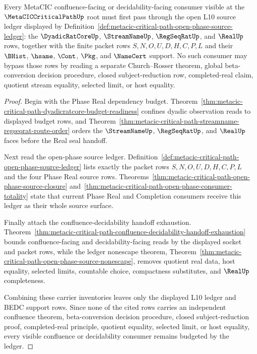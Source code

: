\begin{theorem}
\label{thm:metaciccriticalpath-confluence-decidability-budget}
Every MetaCIC confluence-facing or decidability-facing consumer visible at the $\MetaCICCriticalPathUp$ root must first pass through the open L10 source ledger displayed by Definition~\ref{def:metacic-critical-path-open-phase-source-ledger}: the $\DyadicRatCoreUp$, $\StreamNameUp$, $\RegSeqRatUp$, and $\RealUp$ rows, together with the finite packet rows $S,N,O,U,D,H,C,P,L$ and their $\BHist$, $\hsame$, $\Cont$, $\Pkg$, and $\NameCert$ support. No such consumer may bypass those rows by reading a separate Church--Rosser theorem, global beta-conversion decision procedure, closed subject-reduction row, completed-real claim, quotient stream equality, selected limit, or host equality.
\end{theorem}
\begin{proof}
Begin with the Phase Real dependency budget. Theorem~\ref{thm:metacic-critical-path-dyadicratcore-budget-readiness} confines dyadic observation reads to displayed budget rows, and Theorem~\ref{thm:metacic-critical-path-streamname-regseqrat-route-order} orders the $\StreamNameUp$, $\RegSeqRatUp$, and $\RealUp$ faces before the Real seal handoff.

Next read the open-phase source ledger. Definition~\ref{def:metacic-critical-path-open-phase-source-ledger} lists exactly the packet rows $S,N,O,U,D,H,C,P,L$ and the four Phase Real source rows. Theorems~\ref{thm:metacic-critical-path-open-phase-source-closure} and~\ref{thm:metacic-critical-path-open-phase-consumer-totality} state that current Phase Real and Completion consumers receive this ledger as their whole source surface.

Finally attach the confluence-decidability handoff exhaustion. Theorem~\ref{thm:metacic-critical-path-confluence-decidability-handoff-exhaustion} bounds confluence-facing and decidability-facing reads by the displayed socket and packet rows, while the ledger nonescape theorem, Theorem~\ref{thm:metacic-critical-path-open-phase-source-nonescape}, removes quotient real data, host equality, selected limits, countable choice, compactness substitutes, and $\RealUp$ completeness.

Combining these carrier inventories leaves only the displayed L10 ledger and BEDC support rows. Since none of the cited rows carries an independent confluence theorem, beta-conversion decision procedure, closed subject-reduction proof, completed-real principle, quotient equality, selected limit, or host equality, every visible confluence or decidability consumer remains budgeted by the ledger.
\end{proof}
